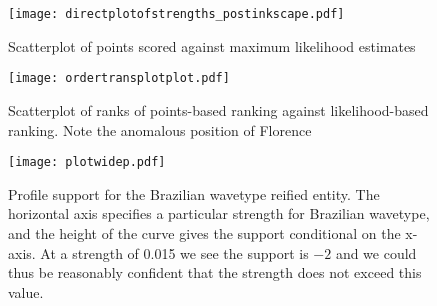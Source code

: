 \documentclass{article}
\begin{document}

\begin{figure}[h]
  \texttt{[image: directplotofstrengths\_postinkscape.pdf]}  %
\caption{Scatterplot of points scored  \label{compare_likelihood_points}
against maximum likelihood estimates}
\end{figure}

\clearpage
\newpage

\begin{figure}[h]
\texttt{[image: ordertransplotplot.pdf]}
\caption{Scatterplot of ranks \label{compare_likelihood_points_rankings} of points-based ranking
against likelihood-based ranking.  Note the anomalous position of
Florence}
\end{figure}

\clearpage
\newpage

\begin{figure}[h]
  \texttt{[image: plotwidep.pdf]}
\caption{Profile support \label{brazilian_wavetype_support} for the
  Brazilian wavetype reified entity.  The horizontal axis specifies a
  particular strength for Brazilian wavetype, and the height of the
  curve gives the support conditional on the x-axis.  At a strength of
  0.015 we see the support is $-2$ and we could thus be reasonably
  confident that the strength does not exceed this value.}
\end{figure}
\end{document}
